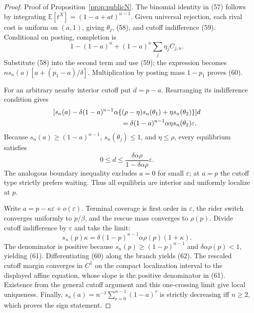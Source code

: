 \documentclass[mnsc,dblanonrev]{informs4}
\newcommand{\E}{\mathbb E}
\begin{document}
\begin{APPENDICES}
\begin{proof}{Proof of Proposition~\ref{prop:publicN}.}
The binomial identity in (57) follows by integrating
$\E[t^X]=(1-a+at)^{n-1}$.  Given universal rejection, each rival cost is
uniform on $(a,1)$, giving $\theta_j$, (58), and cutoff indifference (59).
Conditional on posting, completion is
\[
 1-(1-a)^n+(1-a)^n\sum_j\eta_j C_{j,n}.
\]
Substitute (58) into the second term and use (59); the expression becomes
$ns_n(a)[a+(p_1-a)/\delta]$.  Multiplication by posting mass $1-p_1$
proves (60).

For an arbitrary nearby interior cutoff put $d=p-a$.  Rearranging its
indifference condition gives
\[
 \begin{aligned}
 &[s_n(a)-\delta(1-a)^{n-1}\alpha\{(\rho-\eta)s_n(\theta_1)
       +\eta s_n(\theta_2)\}]d\\
 &\hspace{35mm}=\delta(1-a)^{n-1}\alpha\eta s_n(\theta_2)
 \varepsilon .
 \end{aligned}
\]
Because $s_n(a)\ge(1-a)^{n-1}$, $s_n(\theta_j)\le1$, and
$\eta\le\rho$, every equilibrium satisfies
\[
 0\le d\le\frac{\delta\alpha\rho}{1-\delta\alpha\rho}\varepsilon.
\]
The analogous boundary inequality excludes $a=0$ for small $\varepsilon$;
at $a=p$ the cutoff type strictly prefers waiting.  Thus all equilibria are
interior and uniformly localize at $p$.

Write $a=p-\kappa\varepsilon+o(\varepsilon)$.  Terminal coverage is first
order in $\varepsilon$, the rider switch converges uniformly to $p/\beta$,
and the rescue mass converges to $\rho(p)$.  Divide cutoff indifference by
$\varepsilon$ and take the limit:
\[
 s_n(p)\kappa
 =\delta(1-p)^{n-1}\alpha\rho(p)(1+\kappa).
\]
The denominator is positive because
$s_n(p)\ge(1-p)^{n-1}$ and $\delta\alpha\rho(p)<1$, yielding (61).
Differentiating (60) along the branch yields (62).  The rescaled cutoff margin converges in
$C^1$ on the compact localization interval to the displayed affine equation,
whose slope is the positive denominator in (61).  Existence from the general
cutoff argument and this one-crossing limit give local uniqueness.  Finally,
$s_n(a)=n^{-1}\sum_{r=0}^{n-1}(1-a)^r$ is strictly decreasing iff $n\ge2$,
which proves the sign statement.
\Halmos\end{proof}

\end{APPENDICES}



\end{document}
